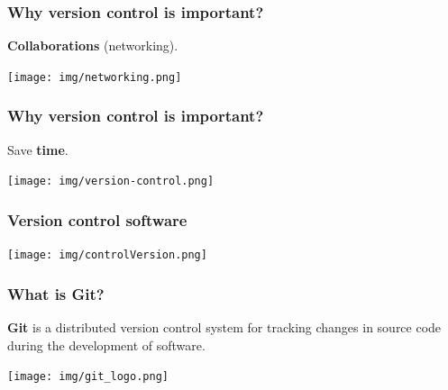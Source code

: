 \documentclass[svgnames]{beamer}
\begin{document}
\begin{frame}
\frametitle{Why version control is important?}
\textbf{Collaborations} (networking).

\begin{center}
\texttt{[image: img/networking.png]}
\end{center}

\end{frame}


\begin{frame}
\frametitle{Why version control is important?}
Save \textbf{time}.

\begin{center}
\texttt{[image: img/version-control.png]}
\end{center}

\end{frame}


\begin{frame}
\frametitle{Version control software}

\begin{center}
\texttt{[image: img/controlVersion.png]}
\end{center}

\end{frame}

\begin{frame}
    \frametitle{What is Git?}

    \textbf{Git} is a distributed version control system for tracking changes in source code during the development of software.

    \hfill \break

    \begin{center}
        \texttt{[image: img/git\_logo.png]}
    \end{center}
\end{frame}
\end{document}
